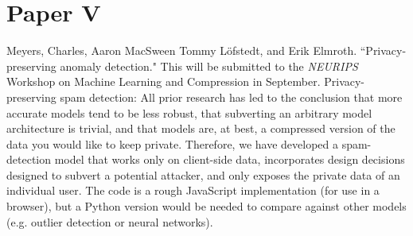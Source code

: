 \section{Paper V}
Meyers, Charles,  Aaron MacSween Tommy Löfstedt, and Erik Elmroth. “Privacy-preserving anomaly detection." This will be submitted to the \textit{NEURIPS} Workshop on Machine Learning and Compression in September.
Privacy-preserving spam detection: All prior research has led to the conclusion that more accurate models tend to be less robust, that subverting an arbitrary model architecture is trivial, and that models are, at best, a compressed version of the data you would like to keep private. Therefore, we have developed a spam-detection model that works only on client-side data, incorporates design decisions designed to subvert a potential attacker, and only exposes the private data of an individual user. The code is a rough JavaScript implementation (for use in a browser), but a Python version would be needed to compare against other models (e.g. outlier detection or neural networks).

